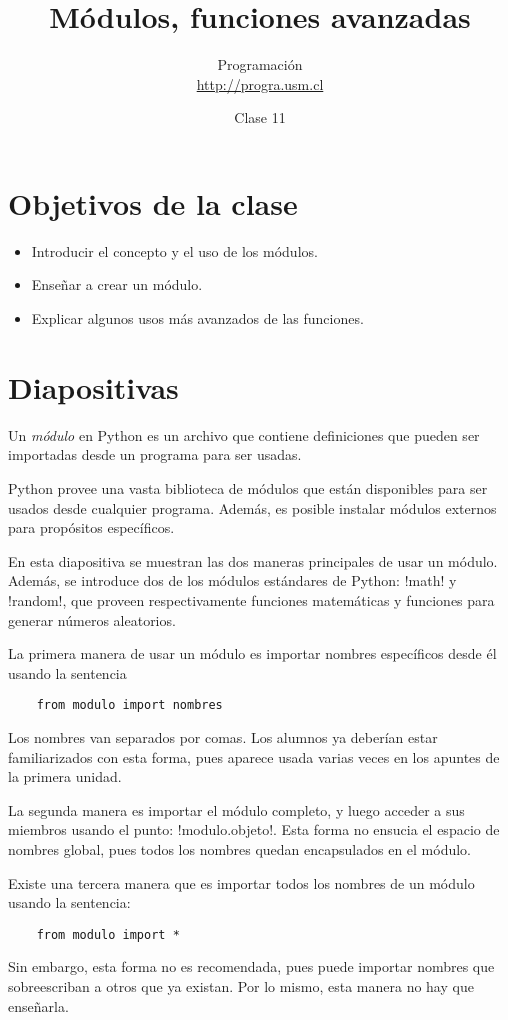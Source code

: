 \documentclass[10pt]{article}
\title{Módulos, funciones avanzadas}
\author{Programación \\ \url{http://progra.usm.cl}}
\date{Clase 11}
\begin{document}
  \maketitle

  \section*{Objetivos de la clase}
  \begin{itemize}
    \item Introducir el concepto y el uso de los módulos.
    \item Enseñar a crear un módulo.
    \item Explicar algunos usos más avanzados de las funciones.
  \end{itemize}

  \section*{Diapositivas}


  Un \emph{módulo} en Python
  es un archivo que contiene definiciones
  que pueden ser importadas desde un programa para ser usadas.

  Python provee una vasta biblioteca de módulos
  que están disponibles para ser usados desde cualquier programa.
  Además, es posible instalar módulos externos
  para propósitos específicos.

  En esta diapositiva
  se muestran las dos maneras principales de usar un módulo.
  Además, se introduce dos de los módulos estándares de Python: \li!math! y \li!random!,
  que proveen respectivamente funciones matemáticas y funciones para generar números aleatorios.

  La primera manera de usar un módulo
  es importar nombres específicos desde él
  usando la sentencia
  \begin{lstlisting}
    from modulo import nombres
  \end{lstlisting}
  Los nombres van separados por comas.
  Los alumnos ya deberían estar familiarizados con esta forma,
  pues aparece usada varias veces en los apuntes de la primera unidad.

  La segunda manera es importar el módulo completo,
  y luego acceder a sus miembros usando el punto:
  \li!modulo.objeto!.
  Esta forma no ensucia el espacio de nombres global,
  pues todos los nombres quedan encapsulados en el módulo.

  Existe una tercera manera que es importar todos los nombres de un módulo
  usando la sentencia:
  \begin{lstlisting}
    from modulo import *
  \end{lstlisting}
  Sin embargo, esta forma no es recomendada,
  pues puede importar nombres que sobreescriban a otros que ya existan.
  Por lo mismo, esta manera no hay que enseñarla.
\end{document}
